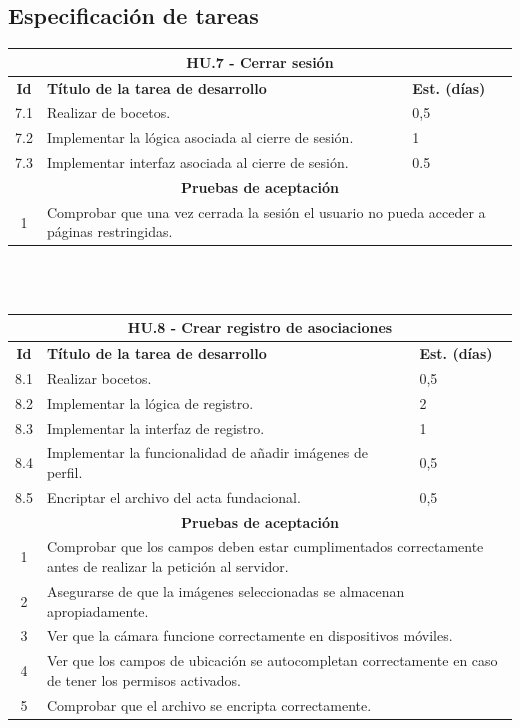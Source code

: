 \subsection{Especificación de tareas}

\begin{tabular}{|c|p{9.5cm}|p{1cm}|}
	\hline
	\multicolumn{3}{|c|}{\textbf{HU.7 - Cerrar sesión}} \\
	\hline
	\textbf{Id} & \textbf{Título de la tarea de desarrollo} & \textbf{Est. (días)} \\
	\hline
	7.1 & Realizar de bocetos. & 0,5 \\ \hline
	7.2 &  Implementar la lógica asociada al cierre de sesión. & 1 \\ \hline
	7.3 &  Implementar interfaz asociada al cierre de sesión. & 0.5 \\ \hline
	\multicolumn{3}{|c|}{\textbf{Pruebas de aceptación}} \\ \hline
	1 & \multicolumn{2}{|p{10cm}|}{Comprobar que una vez cerrada la sesión el usuario no pueda acceder a páginas restringidas.} \\ \hline
\end{tabular} \\ \\

\begin{tabular}{|c|p{9.5cm}|p{1cm}|}
	\hline
	\multicolumn{3}{|c|}{\textbf{HU.8 - Crear registro de asociaciones}} \\
	\hline
	\textbf{Id} & \textbf{Título de la tarea de desarrollo} & \textbf{Est. (días)} \\
	\hline
	8.1 & Realizar bocetos. & 0,5 \\ \hline
	8.2 &  Implementar la lógica de registro. & 2 \\ \hline
	8.3 &  Implementar la interfaz de registro. & 1 \\ \hline
	8.4 &  Implementar la funcionalidad de añadir imágenes de perfil. & 0,5 \\ \hline
	8.5 &  Encriptar el archivo del acta fundacional. & 0,5 \\ \hline
	
	\multicolumn{3}{|c|}{\textbf{Pruebas de aceptación}} \\ \hline
	1 & \multicolumn{2}{|p{10cm}|}{Comprobar que los campos deben estar cumplimentados correctamente antes de realizar la petición al servidor.} \\ \hline
	2 & \multicolumn{2}{|p{10cm}|}{Asegurarse de que la imágenes seleccionadas se almacenan apropiadamente.} \\ \hline
	3 & \multicolumn{2}{|p{10cm}|}{Ver que la cámara funcione correctamente en dispositivos móviles.} \\ \hline
	4 & \multicolumn{2}{|p{10cm}|}{Ver que los campos de ubicación se autocompletan correctamente en caso de tener los permisos activados.} \\ \hline
	5 & \multicolumn{2}{|p{10cm}|}{Comprobar que el archivo se encripta correctamente.} \\ \hline
	
\end{tabular} \\ \\

